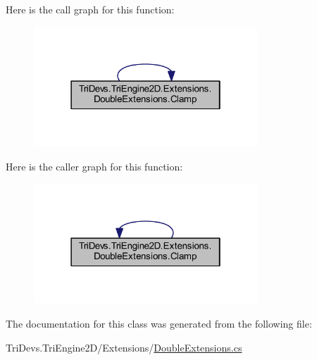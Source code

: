 Here is the call graph for this function\-:
\nopagebreak
\begin{figure}[H]
\begin{center}
\leavevmode
\includegraphics[width=238pt]{class_tri_devs_1_1_tri_engine2_d_1_1_extensions_1_1_double_extensions_ace1b97481b33360d43459090a7a509c8_cgraph}
\end{center}
\end{figure}




Here is the caller graph for this function\-:
\nopagebreak
\begin{figure}[H]
\begin{center}
\leavevmode
\includegraphics[width=238pt]{class_tri_devs_1_1_tri_engine2_d_1_1_extensions_1_1_double_extensions_ace1b97481b33360d43459090a7a509c8_icgraph}
\end{center}
\end{figure}




The documentation for this class was generated from the following file\-:\begin{DoxyCompactItemize}
\item 
Tri\-Devs.\-Tri\-Engine2\-D/\-Extensions/\hyperlink{_double_extensions_8cs}{Double\-Extensions.\-cs}\end{DoxyCompactItemize}

